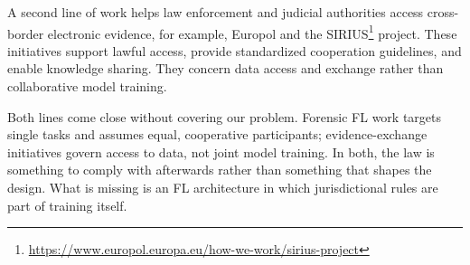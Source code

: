 A second line of work helps law enforcement and judicial authorities access cross-border electronic evidence, for example, Europol and the SIRIUS\footnote{\url{https://www.europol.europa.eu/how-we-work/sirius-project}} project. These initiatives support lawful access, provide standardized cooperation guidelines, and enable knowledge sharing. They concern data access and exchange rather than collaborative model training.

Both lines come close without covering our problem. Forensic FL work targets single tasks and assumes equal, cooperative participants; evidence-exchange initiatives govern access to data, not joint model training. In both, the law is something to comply with afterwards rather than something that shapes the design. What is missing is an FL architecture in which jurisdictional rules are part of training itself.

